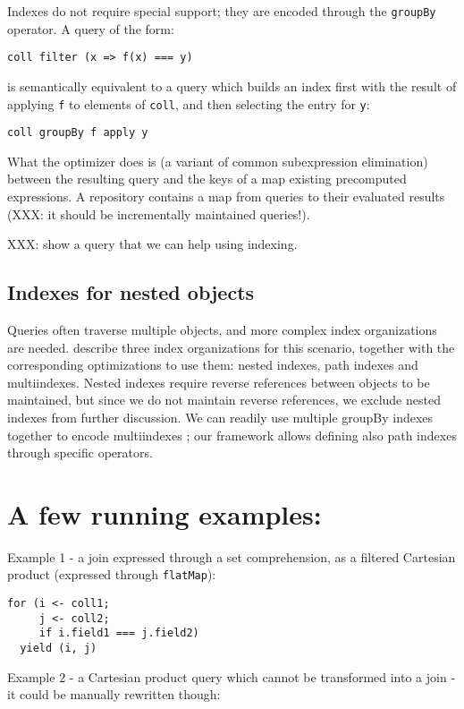 \documentclass[preprint,authoryear,10pt]{sigplanconf}
\begin{document}
Indexes do not require special support; they are encoded through the
\texttt{groupBy} operator. A query of the form:

\begin{lstlisting}
coll filter (x => f(x) === y)
\end{lstlisting}
is semantically equivalent to a query which builds an index first with
the result of applying \texttt{f} to elements of \texttt{coll}, and then
selecting the entry for \texttt{y}:

\begin{lstlisting}
coll groupBy f apply y
\end{lstlisting}
What the optimizer does is (a variant of common subexpression
elimination) between the resulting query and the keys of a map existing
precomputed expressions. A repository contains a map from queries to
their evaluated results (XXX: it should be incrementally maintained
queries!).

XXX: show a query that we can help using indexing.

\subsection{Indexes for nested objects}

Queries often traverse multiple objects, and more complex index
organizations are needed. \citet{Bertino89} describe three index
organizations for this scenario, together with the corresponding
optimizations to use them: nested indexes, path indexes and
multiindexes. Nested indexes require reverse references between objects
to be maintained, but since we do not maintain reverse references, we
exclude nested indexes from further discussion. We can readily use
multiple groupBy indexes together to encode multiindexes
\citep{Bertino89}; our framework allows defining also path indexes
through specific operators.

\section{A few running examples:}

Example 1 - a join expressed through a set comprehension, as a filtered
Cartesian product (expressed through \texttt{flatMap}):

\begin{lstlisting}
for (i <- coll1;
     j <- coll2;
     if i.field1 === j.field2)
  yield (i, j)
\end{lstlisting}
Example 2 - a Cartesian product query which cannot be transformed into a
join - it could be manually rewritten though:
\end{document}

